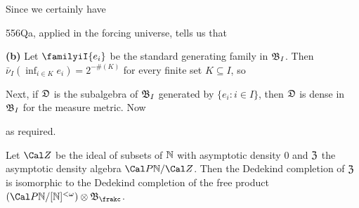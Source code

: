 {Since we certainly have


\noindent 556Qa, applied in the forcing universe, tells us that


\medskip

{\bf (b)} Let $\familyiI{e_i}$ be the standard generating family in
$\frak B_I$.   Then
$\bar\nu_I(\inf_{i\in K}e_i)=2^{-\#(K)}$ for every finite set
$K\subseteq I$, so


\noindent Next, if $\frak D$ is the
subalgebra of $\frak B_I$ generated by $\{e_i:i\in I\}$, then $\frak D$ is
dense in $\frak B_I$ for the measure metric.   Now


\noindent as required.
}%

 Let
$\Cal Z$ be the ideal of subsets of $\Bbb N$
with asymptotic density $0$ and $\frak Z$ the asymptotic density algebra
$\Cal P\Bbb N/\Cal Z$.   Then the Dedekind completion of
$\frak Z$ is isomorphic to the Dedekind
completion of the free product
$(\Cal P\Bbb N/[\Bbb N]^{<\omega})\otimes\frak B_{\frakc}$.

